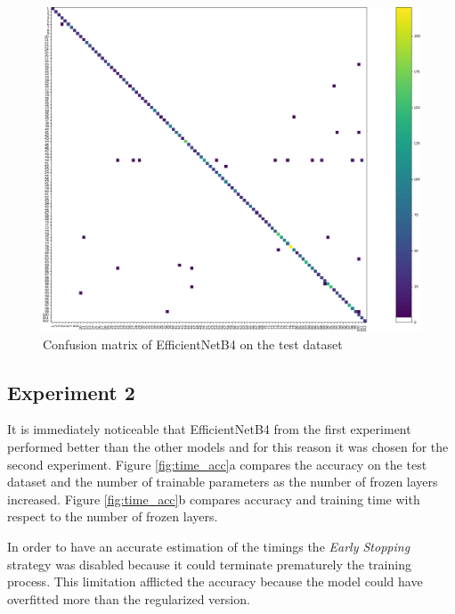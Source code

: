 \begin{figure}[ht!]
\centering
\includegraphics[width=1\textwidth]{images/cm.png} 
\caption{Confusion matrix of EfficientNetB4 on the test dataset}
\label{fig:cm}
\end{figure}

\subsection{Experiment 2}\label{sec:exp2}


It is immediately noticeable that EfficientNetB4 from the first experiment performed better than the other models and for this reason it was chosen for the second experiment. Figure \ref{fig:time_acc}a compares the accuracy on the test dataset and the number of trainable parameters as the number of frozen layers increased. Figure \ref{fig:time_acc}b compares accuracy and training time with respect to the number of frozen layers. \par 
In order to have an accurate estimation of the timings the \textit{Early Stopping} strategy was disabled because it could terminate prematurely the training process. This limitation afflicted the accuracy because the model could have overfitted more than the regularized version.




